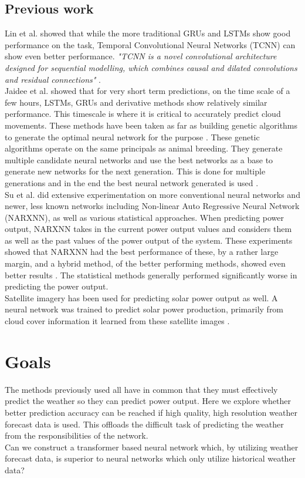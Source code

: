 \subsection{Previous work}
Lin et al. \cite{lin_temporal_2020} showed that while the more traditional GRUs and LSTMs show good performance on the task, Temporal Convolutional Neural Networks (TCNN) can show even better performance. \textit{"TCNN is a novel convolutional architecture designed for sequential modelling, which combines causal and dilated convolutions
and residual connections"} \cite{lin_temporal_2020}. \\
Jaidee et al. \cite{jaidee_very_2019} showed that for very short term predictions, on the time scale of a few hours, LSTMs, GRUs and derivative methods show relatively similar performance. This timescale is where it is critical to accurately predict cloud movements. 
These methods have been taken as far as building genetic algorithms to generate the optimal neural network for the purpose \cite{jaidee_very_2019}. These genetic algorithms operate on the same principals as animal breeding. They generate multiple candidate neural networks and use the best networks as a base to generate new networks for the next generation. This is done for multiple generations and in the end the best neural network generated is used \cite{jaidee_very_2019}.\\
Su et al. \cite{su_machine_2019} did extensive experimentation on more conventional neural networks and newer, less known networks including  Non-linear Auto Regressive Neural Network (NARXNN), as well as various statistical approaches. When predicting power output, NARXNN takes in the current power output values and considers them as well as the past values of the power output of the system. These experiments showed that NARXNN had the best performance of these, by a rather large margin, and a hybrid method, of the better performing methods, showed even better results \cite{anderson_using_2018}. The statistical methods generally performed significantly worse in predicting the power output. \\
Satellite imagery has been used for predicting solar power output as well. A neural network was trained to predict solar power production, primarily from cloud cover information it learned from these satellite images \cite{jang_solar_2016}.\\
 
\section{Goals}
The methods previously used all have in common that they must effectively predict the weather so they can predict power output. 
Here we explore whether better prediction accuracy can be reached
if high quality, high resolution weather forecast data is used. This offloads the difficult task of predicting the weather from the responsibilities of the network. \\
Can we construct a transformer based neural network which, by utilizing weather forecast data, is superior to neural networks which only utilize historical weather data?\\





